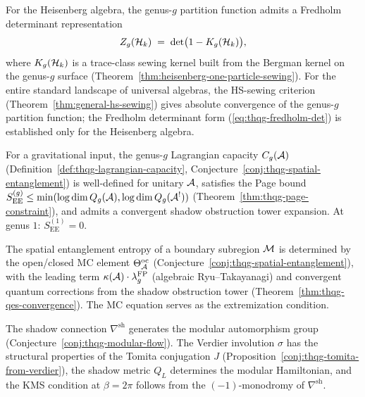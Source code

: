 \begin{theorem}\ClaimStatusProvedHere
\label{thm:thqg-g10-fredholm}
For the Heisenberg algebra, the genus-$g$ partition function admits a
Fredholm determinant representation
\begin{equation}\label{eq:thqg-fredholm-det}
Z_g(\mathcal{H}_k) \;=\; \det\bigl(1 - K_g(\mathcal{H}_k)\bigr),
\end{equation}
where $K_g(\mathcal{H}_k)$ is a trace-class sewing kernel built from the Bergman
kernel on the genus-$g$ surface
(Theorem~\textup{\ref{thm:heisenberg-one-particle-sewing}}).
For the entire standard landscape of universal algebras, the
HS-sewing criterion
(Theorem~\textup{\ref{thm:general-hs-sewing}}) gives absolute convergence
of the genus-$g$ partition function; the Fredholm determinant form
\textup{(}\ref{eq:thqg-fredholm-det}\textup{)} is established only for
the Heisenberg algebra.
\end{theorem}

\begin{conjecture}
\label{conj:thqg-g11-entanglement}
For a gravitational input, the genus-$g$ Lagrangian capacity
$C_g(\mathcal{A})$
(Definition~\ref{def:thqg-lagrangian-capacity},
Conjecture~\ref{conj:thqg-spatial-entanglement})
is well-defined for unitary $\mathcal{A}$, satisfies the Page bound
$S_{\mathrm{EE}}^{(g)} \le \min(\log\dim Q_g(\mathcal{A}), \log\dim Q_g(\mathcal{A}^!))$
(Theorem~\ref{thm:thqg-page-constraint}),
and admits a convergent shadow obstruction tower expansion.
At genus $1$: $S_{\mathrm{EE}}^{(1)} = 0$.
\end{conjecture}

\begin{conjecture}
\label{conj:thqg-g12-qes}
The spatial entanglement entropy of a boundary subregion $\mathcal{M}$ is
determined by the open/closed MC element $\Theta^{\mathrm{oc}}_{\mathcal{A}}$
(Conjecture~\ref{conj:thqg-spatial-entanglement}),
with the leading term $\kappa(\mathcal{A}) \cdot \lambda_g^{\mathrm{FP}}$
(algebraic Ryu--Takayanagi) and convergent quantum corrections from
the shadow obstruction tower (Theorem~\ref{thm:thqg-qes-convergence}).
The MC equation serves as the extremization condition.
\end{conjecture}

\begin{conjecture}
\label{conj:thqg-g13-modular-flow}
The shadow connection $\nabla^{\mathrm{sh}}$ generates the modular
automorphism group (Conjecture~\ref{conj:thqg-modular-flow}).
The Verdier involution $\sigma$ has the structural properties of the Tomita conjugation $J$
(Proposition~\ref{conj:thqg-tomita-from-verdier}),
the shadow metric $Q_L$ determines the modular Hamiltonian,
and the KMS condition at $\beta = 2\pi$ follows from the
$(-1)$-monodromy of $\nabla^{\mathrm{sh}}$.
\end{conjecture}


